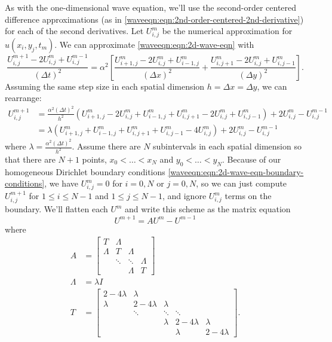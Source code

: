 As with the one-dimensional wave equation, we'll use the second-order centered difference approximations (as in \eqref{waveeqn:eqn:2nd-order-centered-2nd-derivative}) for each of the second derivatives.
Let $U_{i,j}^m$ be the numerical approximation for $u(x_i, y_j, t_m)$.
We can approximate \eqref{waveeqn:eqn:2d-wave-eqn} with
\begin{equation*}
	\frac {U_{i,j}^{m+1} - 2 U_{i,j}^m + U_{i,j}^{m-1}} {(\Delta t)^2}
	= \alpha^2 \left[
		\frac {U_{i+1,j}^m - 2 U_{i,j}^m + U_{i-1,j}^m} {(\Delta x)^2}
		+ \frac {U_{i,j+1}^m - 2 U_{i,j}^m + U_{i,j-1}^m} {(\Delta y)^2}
	\right].
\end{equation*}
Assuming the same step size in each spatial dimension $h = \Delta x = \Delta y$, we can rearrange:
\begin{align}
	\nonumber
	U_{i,j}^{m+1} &= \frac {\alpha^2 (\Delta t)^2} {h^2} (
		U_{i+1,j}^m - 2 U_{i,j}^m + U_{i-1,j}^m + U_{i,j+1}^m - 2 U_{i,j}^m + U_{i,j-1}^m
	) + 2 U_{i,j}^m - U_{i,j}^{m-1}\\
	\label{waveeqn:eqn:2d-wave-eqn-vectorized}
	&= \lambda \left(
		U_{i+1,j}^m + U_{i-1,j}^m + U_{i,j+1}^m + U_{i,j-1}^m - 4 U_{i,j}^m
	\right) + 2 U_{i,j}^m - U_{i,j}^{m-1}
\end{align}
where $\lambda = \frac {\alpha^2 (\Delta t)^2} {h^2}$.
Assume there are $N$ subintervals in each spatial dimension so that there are $N+1$ points, $x_0 < \ldots < x_N$ and $y_0 < \ldots < y_N$.
Because of our homogeneous Dirichlet boundary conditions \eqref{waveeqn:eqn:2d-wave-eqn-boundary-conditions}, we have $U_{i, j}^m = 0$ for $i = 0, N$ or $j = 0, N$, so we can just compute $U_{i, j}^{m+1}$ for $1 \le i \le N-1$ and $1 \le j \le N-1$, and ignore $U_{i, j}^m$ terms on the boundary.
We'll flatten each $U^m$ and write this scheme as the matrix equation
\begin{equation}
	\label{waveeqn:eqn:2d-wave-eqn-matrix}
    U^{m+1} = A U^{m} - U^{m-1}
\end{equation}
where
\begin{align*}
A &=
\begin{bmatrix}
	T 		& \Lambda &  		& \\
	\Lambda & T 	  & \Lambda & \\
			& \ddots  & \ddots  & \Lambda \\
			&		  & \Lambda & T
\end{bmatrix} \\
\Lambda &= \lambda I \\
T &=
\begin{bmatrix}
	2 - 4 \lambda & \lambda 	  &			& 		 		& \\
	\lambda 	  & 2 - 4 \lambda & \lambda & 				& \\
				  & \ddots 		  & \ddots 	& \ddots 		& \\
				  &				  & \lambda & 2 - 4 \lambda & \lambda \\
				  &				  & 		& \lambda		& 2 - 4 \lambda
\end{bmatrix}.
\end{align*}
